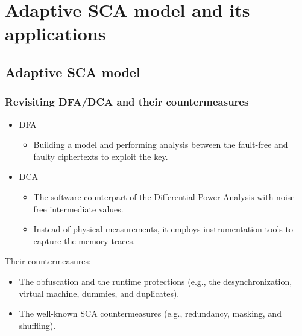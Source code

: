 \documentclass{beamer}
\begin{document}
\section{Adaptive SCA model and its applications}
\subsection{Adaptive SCA model}


\frame
{
	\frametitle{Revisiting DFA/DCA and their countermeasures}
	\begin{itemize}
		\item DFA
		\begin{itemize}
	    \item Building a model and performing analysis between the fault-free and faulty ciphertexts to exploit the key.
		\end{itemize}

		\item DCA
		\begin{itemize}
			\item The software counterpart of the Differential Power Analysis with noise-free intermediate values.
            \item Instead of physical measurements, it employs instrumentation tools to capture the memory traces.
		\end{itemize}
	\end{itemize}

    Their countermeasures:
	\begin{itemize}
		\item The obfuscation and the runtime protections (e.g., the desynchronization, virtual machine, dummies, and duplicates).
		\item The well-known SCA countermeasures (e.g., redundancy, masking, and shuffling).
	\end{itemize}
}
\end{document}
